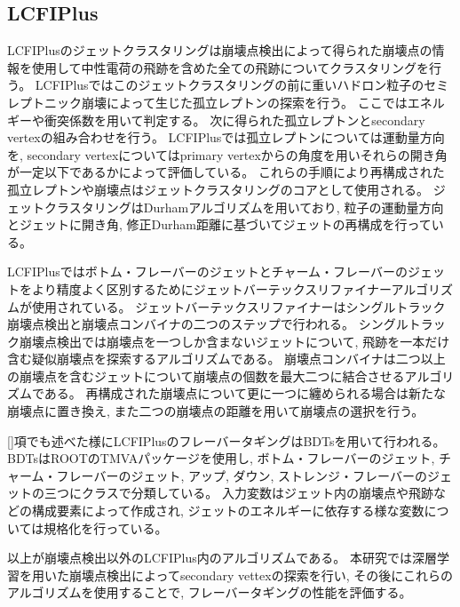 \subsection{LCFIPlus} \label{Com:FlaTagCom:LCFIPlus}

LCFIPlusのジェットクラスタリングは崩壊点検出によって得られた崩壊点の情報を使用して中性電荷の飛跡を含めた全ての飛跡についてクラスタリングを行う。
LCFIPlusではこのジェットクラスタリングの前に重いハドロン粒子のセミレプトニック崩壊によって生じた孤立レプトンの探索を行う。
ここではエネルギーや衝突係数を用いて判定する。
次に得られた孤立レプトンとsecondary vertexの組み合わせを行う。
LCFIPlusでは孤立レプトンについては運動量方向を, secondary vertexについてはprimary vertexからの角度を用いそれらの開き角が一定以下であるかによって評価している。
これらの手順により再構成された孤立レプトンや崩壊点はジェットクラスタリングのコアとして使用される。
ジェットクラスタリングはDurhamアルゴリズムを用いており, 粒子の運動量方向とジェットに開き角, 修正Durham距離に基づいてジェットの再構成を行っている。

LCFIPlusではボトム・フレーバーのジェットとチャーム・フレーバーのジェットをより精度よく区別するためにジェットバーテックスリファイナーアルゴリズムが使用されている。
ジェットバーテックスリファイナーはシングルトラック崩壊点検出と崩壊点コンバイナの二つのステップで行われる。
シングルトラック崩壊点検出では崩壊点を一つしか含まないジェットについて, 飛跡を一本だけ含む疑似崩壊点を探索するアルゴリズムである。
崩壊点コンバイナは二つ以上の崩壊点を含むジェットについて崩壊点の個数を最大二つに結合させるアルゴリズムである。
再構成された崩壊点について更に一つに纏められる場合は新たな崩壊点に置き換え, また二つの崩壊点の距離を用いて崩壊点の選択を行う。

\ref{}項でも述べた様にLCFIPlusのフレーバータギングはBDTsを用いて行われる。
BDTsはROOTのTMVAパッケージを使用し, ボトム・フレーバーのジェット, チャーム・フレーバーのジェット, アップ, ダウン, ストレンジ・フレーバーのジェットの三つにクラスで分類している。
入力変数はジェット内の崩壊点や飛跡などの構成要素によって作成され, ジェットのエネルギーに依存する様な変数については規格化を行っている。

以上が崩壊点検出以外のLCFIPlus内のアルゴリズムである。
本研究では深層学習を用いた崩壊点検出によってsecondary vettexの探索を行い, その後にこれらのアルゴリズムを使用することで, フレーバータギングの性能を評価する。


